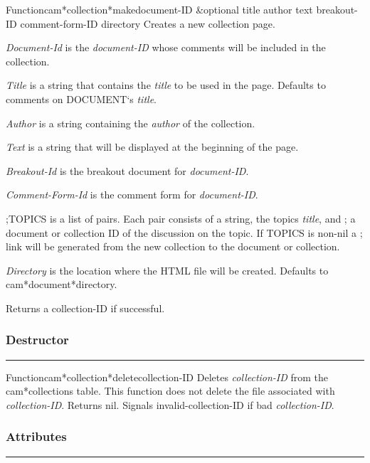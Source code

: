 \begin{functiondoc}{Function}{cam*collection*make}{document-ID \&optional title author text breakout-ID comment-form-ID directory}
Creates a new collection page.

{\em Document-Id} is the {\em document-ID} whose comments will be included in the collection.

{\em Title} is a string that contains the {\em title} to be used in the page.  Defaults to
 comments on DOCUMENT`s {\em title}.

{\em Author} is a string containing the {\em author} of the collection. 

{\em Text} is a string that will be displayed at the beginning of the page.

{\em Breakout-Id} is the breakout document for {\em document-ID}.

{\em Comment-Form-Id} is the comment form for {\em document-ID}.

;TOPICS is a list of pairs.  Each pair consists of a string, the topics {\em title}, and
; a document or collection ID of the discussion on the topic.  If TOPICS is non-nil a
; link will be generated from the new collection to the document or collection.

{\em Directory} is the location where the HTML file will be created.  Defaults to
 cam*document*directory.

Returns a collection-ID if successful.
\end{functiondoc}


\subsubsection*{Destructor}
\par\vspace*{0.00in}\par\hrule\par\medskip\par


\begin{functiondoc}{Function}{cam*collection*delete}{collection-ID}
Deletes {\em collection-ID} from the cam*collections table.
This function does not delete the file associated with {\em collection-ID}.
Returns nil.
Signals invalid-collection-ID if bad {\em collection-ID}.
\end{functiondoc}


\subsubsection*{Attributes}
\par\vspace*{0.00in}\par\hrule\par\medskip\par


